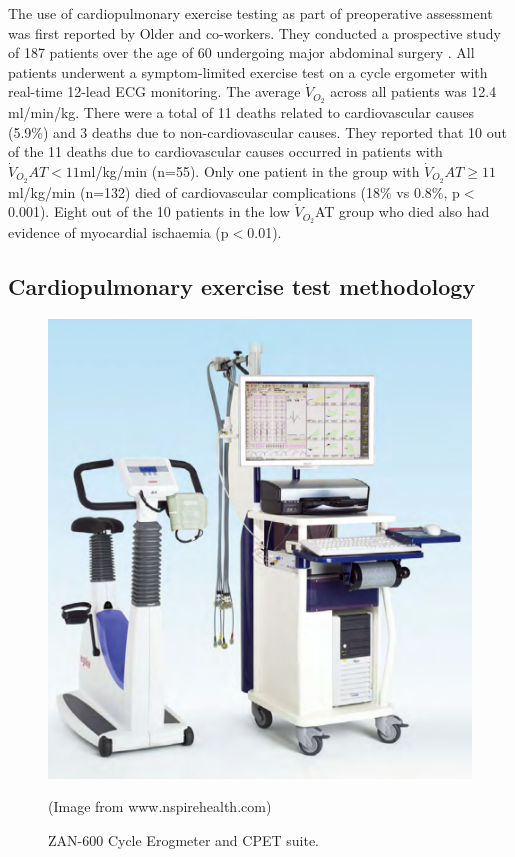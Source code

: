 The use of cardiopulmonary exercise testing as part of preoperative assessment was first reported by Older and co-workers.
They conducted a prospective study of 187 patients over the age of 60 undergoing major abdominal surgery  \parencite{older_preoperative_1993}. 
All patients underwent a symptom-limited exercise test on a cycle ergometer with real-time 12-lead ECG monitoring. 
The average $\dot{V}_{O_2}$ across all patients was 12.4 ml/min/kg. 
There were a total of 11 deaths related to cardiovascular causes (5.9\%) and 3 deaths due to non-cardiovascular causes. 
They reported that 10 out of the 11 deaths due to cardiovascular causes occurred in patients with $\dot{V}_{O_2}AT<11$ml/kg/min (n=55).
Only one patient in the group with $\dot{V}_{O_2}AT\geq11$ml/kg/min (n=132) died of cardiovascular complications (18\% vs 0.8\%, p$<$0.001). 
Eight out of the 10 patients in the low $\dot{V}_{O_2}$AT group who died also had evidence of myocardial ischaemia (p$<$0.01). 


\subsection{Cardiopulmonary exercise test methodology}
\label{sec:cpx_method}

\begin{figure}[htbp]
	\centering
	\includegraphics[width=\textwidth]{Figures/cpet-zan}
	\caption{ZAN-600 Cycle Erogmeter and CPET suite.}
	(Image from www.nspirehealth.com)
	\label{fig:cpet-zan}
\end{figure}

